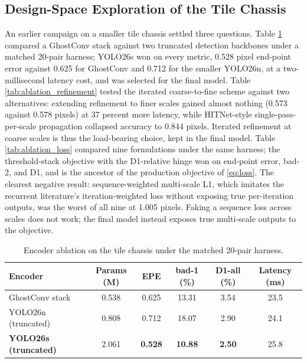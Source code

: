 \subsection{Design-Space Exploration of the Tile Chassis}
An earlier campaign on a smaller tile chassis settled three questions.
Table \ref{tab:ablation_encoder} compared a GhostConv stack against two
truncated detection backbones under a matched 20-pair harness; YOLO26s
won on every metric, 0.528 pixel end-point error against 0.625 for
GhostConv and 0.712 for the smaller YOLO26n, at a two-millisecond
latency cost, and was selected for the final model. Table
\ref{tab:ablation_refinement} tested the iterated coarse-to-fine
scheme against two alternatives: extending refinement to finer scales
gained almost nothing (0.573 against 0.578 pixels) at 37 percent more
latency, while HITNet-style single-pass-per-scale propagation
collapsed accuracy to 0.844 pixels. Iterated refinement at coarse
scales is thus the load-bearing choice, kept in the final model. Table
\ref{tab:ablation_loss} compared nine formulations under the same
harness; the threshold-stack objective with the D1-relative hinge won
on end-point error, bad-2, and D1, and is the ancestor of the
production objective of \eqref{eq:loss}. The clearest negative result:
sequence-weighted multi-scale L1, which imitates the recurrent
literature's iteration-weighted loss without exposing true
per-iteration outputs, was the worst of all nine at 1.005 pixels.
Faking a sequence loss across scales does not work; the final model
instead exposes true multi-scale outputs to the objective.

\begin{table}[!htbp]
\centering
\caption{Encoder ablation on the tile chassis under the matched 20-pair harness.}
\label{tab:ablation_encoder}
\small
\begin{tabular}{lccccc}
\toprule
Encoder & Params (M) & EPE & bad-1 (\%) & D1-all (\%) & Latency (ms)\\
\midrule
GhostConv stack & 0.538 & 0.625 & 13.31 & 3.54 & 23.5\\
YOLO26n (truncated) & 0.808 & 0.712 & 18.07 & 2.90 & 24.1\\
\textbf{YOLO26s (truncated)} & 2.061 & \textbf{0.528} & \textbf{10.88} & \textbf{2.50} & 25.8\\
\bottomrule
\end{tabular}
\end{table}

